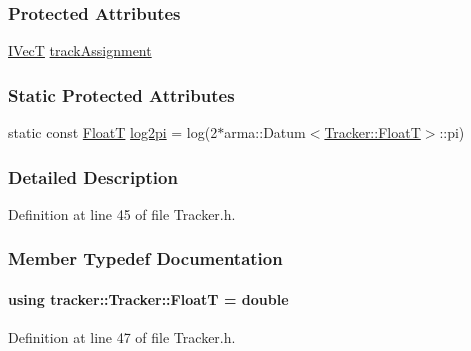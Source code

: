 \subsubsection*{Protected Attributes}
\begin{DoxyCompactItemize}
\item 
\hyperlink{classtracker_1_1Tracker_a59a6e01be987f9c0093a8ac5ad97ce33}{I\+VecT} \hyperlink{classtracker_1_1Tracker_a638ecbd5a6466c2730e7c7b9561e9fc9}{track\+Assignment}
\end{DoxyCompactItemize}
\subsubsection*{Static Protected Attributes}
\begin{DoxyCompactItemize}
\item 
static const \hyperlink{classtracker_1_1Tracker_a66e8a81f12871e23082264c964f8f103}{FloatT} \hyperlink{classtracker_1_1Tracker_adf40b4f798f070419f5eb697b36b65ac}{log2pi} = log(2$\ast$arma\+::\+Datum$<$\hyperlink{classtracker_1_1Tracker_a66e8a81f12871e23082264c964f8f103}{Tracker\+::\+FloatT}$>$\+::pi)
\end{DoxyCompactItemize}


\subsubsection{Detailed Description}


Definition at line 45 of file Tracker.\+h.



\subsubsection{Member Typedef Documentation}
\paragraph[{\texorpdfstring{FloatT}{FloatT}}]{\setlength{\rightskip}{0pt plus 5cm}using {\bf tracker\+::\+Tracker\+::\+FloatT} =  double}\hypertarget{classtracker_1_1Tracker_a66e8a81f12871e23082264c964f8f103}{}\label{classtracker_1_1Tracker_a66e8a81f12871e23082264c964f8f103}


Definition at line 47 of file Tracker.\+h.


